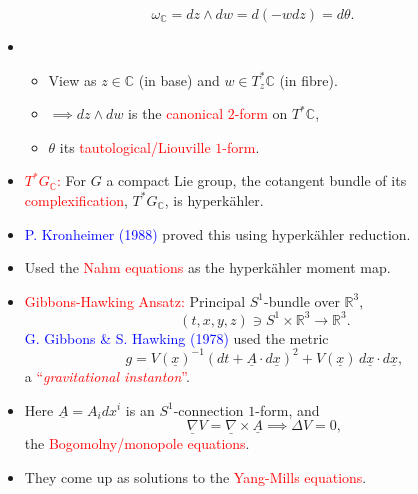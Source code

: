 \begin{frame}
    \[
        \omega_{\mathbb{C}} = dz \wedge dw = d(-wdz) = d\theta.
    \]
    \begin{itemize}
        \item 
        \begin{itemize}
            \item View as $z\in \mathbb{C}$ (in base) and $w \in T_{z}^{\ast}\mathbb{C}$ (in fibre).
            \item $\implies dz \wedge dw$ is the \textcolor{red}{canonical $2$-form} on $T^{\ast}\mathbb{C}$,
            \item $\theta$ its \textcolor{red}{tautological/Liouville $1$-form}.
        \end{itemize}
        \item \textcolor{red}{$T^{\ast}G_{\mathbb{C}}$:} For $G$ a compact Lie group, the cotangent bundle of its \textcolor{red}{complexification}, $T^{\ast}G_{\mathbb{C}}$, is hyperk\"ahler.
        \item \textcolor{blue}{P. Kronheimer (1988)} proved this using hyperk\"ahler reduction.
        \item Used the \textcolor{red}{Nahm equations} as the hyperk\"ahler moment map.
    \end{itemize}
\end{frame}

\begin{frame}
    \begin{itemize}
        \item \textcolor{red}{Gibbons-Hawking Ansatz:} Principal $S^{1}$-bundle over $\mathbb{R}^{3}$,
        \[
            (t,x,y,z) \ni S^{1} \times \mathbb{R}^{3} \rightarrow \mathbb{R}^{3}.
        \]
        \textcolor{blue}{G. Gibbons \& S. Hawking (1978)} used the metric
        \[
            g = V(\underline{x})^{-1}(dt + \underline{A} \cdot d\underline{x})^{2} + V(\underline{x})\, d\underline{x} \cdot d\underline{x},
        \]
        a \textcolor{red}{``\emph{gravitational instanton}''}.
        \item Here $\underline{A} = A_{i}dx^{i}$ is an $S^{1}$-connection $1$-form, and
        \[
            \underline{\nabla}V = \underline{\nabla} \times \underline{A} \implies \Delta V = 0,
        \]
        the \textcolor{red}{Bogomolny/monopole equations}.
        \item They come up as solutions to the \textcolor{red}{Yang-Mills equations}.
    \end{itemize}
\end{frame}